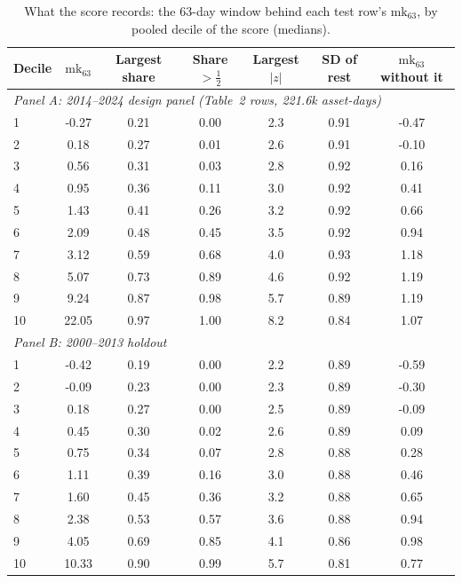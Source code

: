 \documentclass[11pt]{article}
\begin{document}
\begin{table}[htbp]
\centering
\begin{threeparttable}
\caption{What the score records: the 63-day window behind each test row's $\mathrm{mk}_{63}$, by pooled decile of the score (medians).}
\label{tab:anatomy}
\footnotesize
\begin{tabular}{lcccccc}
\toprule
Decile & $\mathrm{mk}_{63}$ & Largest share & Share $>\tfrac12$ & Largest $|z|$ & SD of rest & $\mathrm{mk}_{63}$ without it \\
\midrule
\multicolumn{7}{l}{\emph{Panel A: 2014--2024 design panel (Table~2 rows, 221.6k asset-days)}} \\
1 & -0.27 & 0.21 & 0.00 & 2.3 & 0.91 & -0.47 \\
2 & 0.18 & 0.27 & 0.01 & 2.6 & 0.91 & -0.10 \\
3 & 0.56 & 0.31 & 0.03 & 2.8 & 0.92 & 0.16 \\
4 & 0.95 & 0.36 & 0.11 & 3.0 & 0.92 & 0.41 \\
5 & 1.43 & 0.41 & 0.26 & 3.2 & 0.92 & 0.66 \\
6 & 2.09 & 0.48 & 0.45 & 3.5 & 0.92 & 0.94 \\
7 & 3.12 & 0.59 & 0.68 & 4.0 & 0.93 & 1.18 \\
8 & 5.07 & 0.73 & 0.89 & 4.6 & 0.92 & 1.19 \\
9 & 9.24 & 0.87 & 0.98 & 5.7 & 0.89 & 1.19 \\
10 & 22.05 & 0.97 & 1.00 & 8.2 & 0.84 & 1.07 \\
\midrule
\multicolumn{7}{l}{\emph{Panel B: 2000--2013 holdout}} \\
1 & -0.42 & 0.19 & 0.00 & 2.2 & 0.89 & -0.59 \\
2 & -0.09 & 0.23 & 0.00 & 2.3 & 0.89 & -0.30 \\
3 & 0.18 & 0.27 & 0.00 & 2.5 & 0.89 & -0.09 \\
4 & 0.45 & 0.30 & 0.02 & 2.6 & 0.89 & 0.09 \\
5 & 0.75 & 0.34 & 0.07 & 2.8 & 0.88 & 0.28 \\
6 & 1.11 & 0.39 & 0.16 & 3.0 & 0.88 & 0.46 \\
7 & 1.60 & 0.45 & 0.36 & 3.2 & 0.88 & 0.65 \\
8 & 2.38 & 0.53 & 0.57 & 3.6 & 0.88 & 0.94 \\
9 & 4.05 & 0.69 & 0.85 & 4.1 & 0.86 & 0.98 \\
10 & 10.33 & 0.90 & 0.99 & 5.7 & 0.81 & 0.77 \\
\bottomrule

\end{tabular}
\end{threeparttable}
\end{table}
\end{document}
